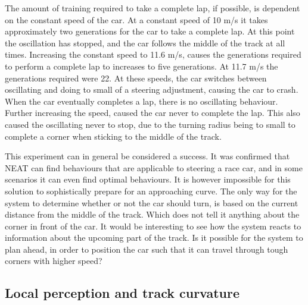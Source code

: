 The amount of training required to take a complete lap, if possible, is dependent on the constant speed of the car. At a constant speed of 10 m/s it takes approximately two generations for the car to take a complete lap. At this point the oscillation has stopped, and the car follows the middle of the track at all times. Increasing the constant speed to 11.6 m/s, causes the generations required to perform a complete lap to increases to five generations. At 11.7 m/s the generations required were 22. At these speeds, the car switches between oscillating and doing to small of a steering adjustment, causing the car to crash. When the car eventually completes a lap, there is no oscillating behaviour. Further increasing the speed, caused the car never to complete the lap. This also caused the oscillating never to stop, due to the turning radius being to small to complete a corner when sticking to the middle of the track.


This experiment can in general be considered a success. It was confirmed that NEAT can find behaviours that are applicable to steering a race car, and in some scenarios it can even find optimal behaviours. It is however impossible for this solution to sophistically prepare for an approaching curve. The only way for the system to determine whether or not the car should turn, is based on the current distance from the middle of the track. Which does not tell it anything about the corner in front of the car. It would be interesting to see how the system reacts to information about the upcoming part of the track. Is it possible for the system to plan ahead, in order to position the car such that it can travel through tough corners with higher speed?

\subsection{Local perception and track curvature}
\label{subsec:fixedspeedcurvature}




